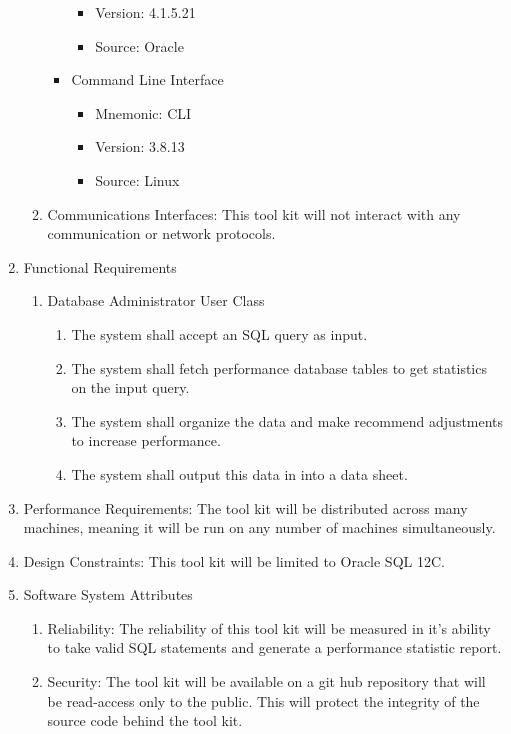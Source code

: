 \documentclass[draftclsnofoot, onecolumn, compsoc, 10pt]{IEEEtran}
\begin{document}
\begin{enumerate}
\begin{enumerate}
\begin{itemize}
\begin{itemize}
        \item Version: 4.1.5.21
        \item Source: Oracle
	\end{itemize}
    \item Command Line Interface
	\begin{itemize}
		\item Mnemonic: CLI
        \item Version: 3.8.13
        \item Source: Linux
	\end{itemize}
	\end{itemize}
        \item Communications Interfaces: This tool kit will not  interact with any communication or network protocols.
    \end{enumerate}
    \item Functional Requirements
    \begin{enumerate}
    	\item Database Administrator User Class
        	\begin{enumerate}
				\item The system shall accept an SQL query as input.
    			\item The system shall fetch performance database tables to get statistics on the input query.
    			\item The system shall organize the data and make recommend adjustments to increase performance.
    			\item The system shall output this data in into a data sheet.
\end{enumerate}
    \end{enumerate}
    \item Performance Requirements: The tool kit will be distributed across many machines, meaning it will be run on any number of machines simultaneously. 
    \item Design Constraints: This tool kit will be limited to Oracle SQL 12C.
    \item Software System Attributes
    \begin{enumerate}
    	\item Reliability: The reliability of this tool kit will be measured in it's ability to take valid SQL statements and generate a performance statistic report. 
        \item Security: The tool kit will be available on a git hub repository that will be read-access only to the public. 
This will protect the integrity of the source code behind the tool kit. 

\end{enumerate}
\end{enumerate}
\end{document}
